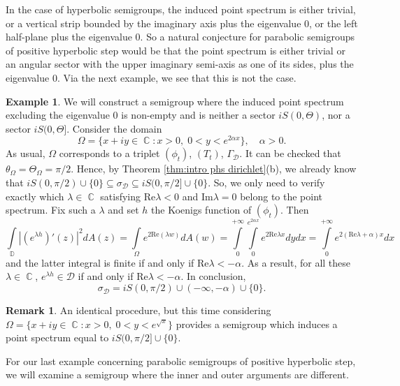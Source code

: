 \documentclass[11pt]{amsart}
\numberwithin{equation}{section}
\theoremstyle{definition}
\newtheorem{remark}[theorem]{Remark}
\newtheorem{example}[theorem]{Example}
\DeclareMathOperator{\C}{\mathbb{C}}
\DeclareMathOperator{\D}{\mathbb{D}}
\begin{document}
	In the case of hyperbolic semigroups, the induced point spectrum is either trivial, or a vertical strip bounded by the imaginary axis plus the eigenvalue $0$, or the left half-plane plus the eigenvalue $0$. So a natural conjecture for parabolic semigroups of positive hyperbolic step would be that the point spectrum is either trivial or an angular sector with the upper imaginary semi-axis as one of its sides, plus the eigenvalue $0$. Via the next example, we see that this is not the case.
	
	\begin{example}\label{ex:any strip}
		We will construct a semigroup where the induced point spectrum excluding the eigenvalue $0$ is non-empty and is neither a sector $iS(0,\Theta)$, nor a sector $iS(0,\Theta]$. Consider the domain 
		$$\Omega=\{x+iy\in\C:x>0,\; 0<y<e^{2\alpha x}\}, \quad \alpha>0.$$
		As usual, $\Omega$ corresponds to a triplet $(\phi_t)$, $(T_t)$, $\Gamma_\mathcal{D}$. It can be checked that $\theta_\Omega=\Theta_\Omega=\pi/2$. Hence, by Theorem \ref{thm:intro phs dirichlet}(b), we already know that $iS(0,\pi/2)\cup\{0\}\subseteq \sigma_\mathcal{D} \subseteq iS(0,\pi/2]\cup\{0\}$. So, we only need to verify exactly which $\lambda\in\C$ satisfying $\mathrm{Re}\lambda<0$ and $\mathrm{Im}\lambda=0$ belong to the point spectrum. Fix such a $\lambda$ and set $h$ the Koenigs function of $(\phi_t)$. Then
		\begin{equation*}
			\int\limits_{\D}\left|\left(e^{\lambda h}\right)'(z)\right|^2dA(z)=\int\limits_{\Omega}e^{2\mathrm{Re}(\lambda w)}dA(w)
			=\int\limits_{0}^{+\infty}\int\limits_{0}^{e^{2\alpha x}}e^{2\mathrm{Re}\lambda x}dydx
			=\int\limits_{0}^{+\infty}e^{2(\mathrm{Re}\lambda+\alpha)x}dx
		\end{equation*}
		and the latter integral is finite if and only if $\mathrm{Re}\lambda<-\alpha$. As a result, for all these $\lambda\in\C$, $e^{\lambda h}\in\mathcal{D}$ if and only if $\mathrm{Re}\lambda<-\alpha$. In conclusion,
		$$\sigma_\mathcal{D}=iS(0,\pi/2)\cup(-\infty,-\alpha)\cup\{0\}.$$
	\end{example}
	
	\begin{remark}
		An identical procedure, but this time considering $\Omega=\{x+iy\in\C:x>0,\; 0<y<e^{\sqrt{x}}\}$ provides a semigroup which induces a point spectrum equal to $iS(0,\pi/2]\cup\{0\}$.
	\end{remark}
	
	For our last example concerning parabolic semigroups of positive hyperbolic step, we will examine a semigroup where the inner and outer arguments are different.
	
\end{document}
